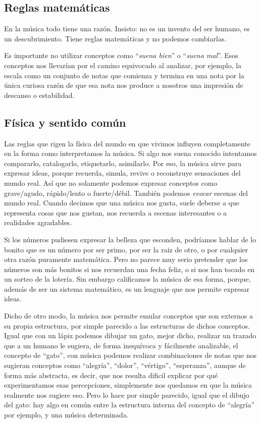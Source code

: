 \documentclass[]{article}
\begin{document}
\subsection{Reglas matemáticas}

En la música todo tiene una razón. Insisto: no es un invento del ser humano, es un descubrimiento. Tiene reglas matemáticas y no podemos cambiarlas.

Es importante no utilizar conceptos como ``\emph{suena   bien}'' o ``\emph{suena mal}''. Esos conceptos nos llevarían por el camino equivocado al analizar, por ejemplo, la escala como un conjunto de notas que comienza y termina en una nota por la única curiosa razón de que esa nota nos produce a nosotros una impresión de descanso o estabilidad.

\subsection{Física y sentido común}

Las reglas que rigen la física del mundo en que vivimos influyen completamente en la forma como interpretamos la música. Si algo nos suena conocido intentamos compararlo, catalogarlo, etiquetarlo, asimilarlo. Por eso, la música sirve para expresar ideas, porque recuerda, simula, revive o reconstruye sensaciones del mundo real. Así que no solamente podemos expresar conceptos como grave/agudo, rápido/lento o fuerte/débil. También podemos \emph{evocar} escenas del mundo real. Cuando decimos que una música nos gusta, suele deberse a que representa cosas que nos gustan, nos recuerda a escenas interesantes o a realidades agradables.

Si los números pudiesen expresar la belleza que esconden, podríamos hablar de lo bonito que es un número por ser primo, por ser la raiz de otro, o por cualquier otra razón puramente matemática. Pero no parece muy serio pretender que los números son más bonitos si nos recuerdan una fecha feliz, o si nos han tocado en un sorteo de la lotería. Sin embargo calificamos la música de esa forma, porque, además de ser un sistema matemático, es un lenguaje que nos permite expresar ideas.

Dicho de otro modo, la música nos permite emular conceptos que son externos a su propia estructura, por simple parecido a las estructuras de dichos conceptos. Igual que con un lápiz podemos dibujar un gato, mejor dicho, realizar un trazado que a un humano le sugiera, de forma inequívoca y fácilmente analizable, el concepto de ``gato'', con música podemos realizar combinaciones de notas que nos sugieran conceptos como ``alegría'', ``dolor'', ``vértigo'', ``esperanza'', aunque de forma más abstracta, es decir, que nos resulta dificil explicar por qué experimentamos esas percepciones, simplemente nos quedamos en que la música realmente nos sugiere eso. Pero lo hace por simple parecido, igual que el dibujo del gato: hay algo en común entre la estructura interna del concepto de ``alegría'' por ejemplo, y una música determinada.
\end{document}
